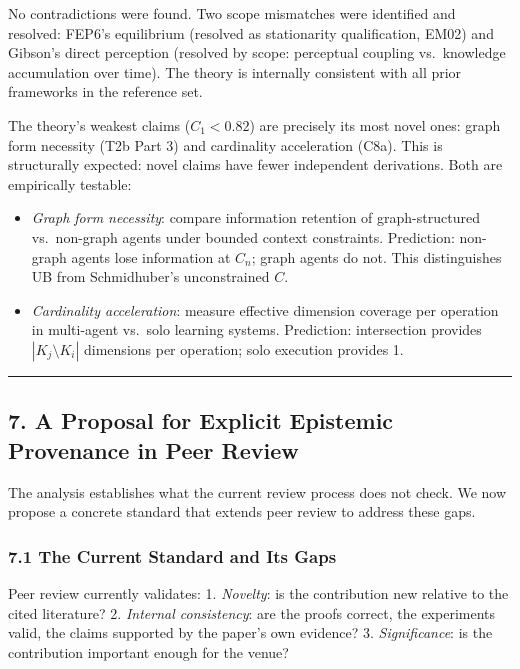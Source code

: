 \documentclass[
]{article}
\providecommand{\tightlist}{%
  \setlength{\itemsep}{0pt}\setlength{\parskip}{0pt}}
\begin{document}
No contradictions were found. Two scope mismatches were identified and
resolved: FEP6's equilibrium (resolved as stationarity qualification,
EM02) and Gibson's direct perception (resolved by scope: perceptual
coupling vs.~knowledge accumulation over time). The theory is internally
consistent with all prior frameworks in the reference set.

The theory's weakest claims (\(C_1 < 0.82\)) are precisely its most
novel ones: graph form necessity (T2b Part 3) and cardinality
acceleration (C8a). This is structurally expected: novel claims have
fewer independent derivations. Both are empirically testable:

\begin{itemize}
\tightlist
\item
  \emph{Graph form necessity}: compare information retention of
  graph-structured vs.~non-graph agents under bounded context
  constraints. Prediction: non-graph agents lose information at \(C_n\);
  graph agents do not. This distinguishes UB from Schmidhuber's
  unconstrained \(C\).
\item
  \emph{Cardinality acceleration}: measure effective dimension coverage
  per operation in multi-agent vs.~solo learning systems. Prediction:
  intersection provides \(|K_j \setminus K_i|\) dimensions per
  operation; solo execution provides 1.
\end{itemize}

\begin{center}\rule{0.5\linewidth}{0.5pt}\end{center}

\subsection{7. A Proposal for Explicit Epistemic Provenance in Peer
Review}\label{a-proposal-for-explicit-epistemic-provenance-in-peer-review}

The analysis establishes what the current review process does not check.
We now propose a concrete standard that extends peer review to address
these gaps.

\subsubsection{7.1 The Current Standard and Its
Gaps}\label{the-current-standard-and-its-gaps}

Peer review currently validates: 1. \emph{Novelty}: is the contribution
new relative to the cited literature? 2. \emph{Internal consistency}:
are the proofs correct, the experiments valid, the claims supported by
the paper's own evidence? 3. \emph{Significance}: is the contribution
important enough for the venue?
\end{document}
